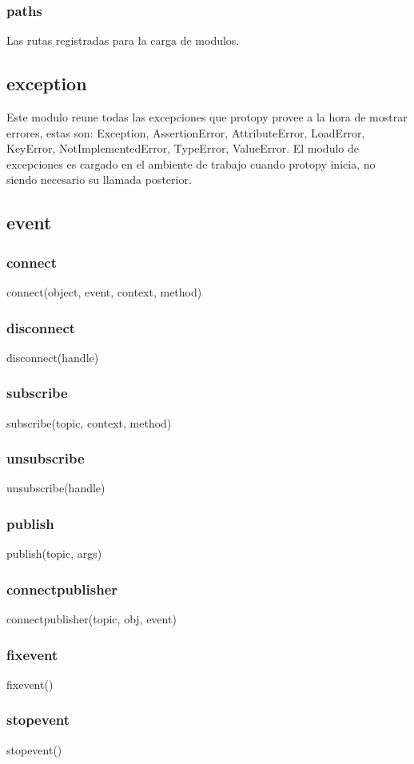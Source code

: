 \subsubsection*{paths}
Las rutas registradas para la carga de modulos.

\subsection{exception}
Este modulo reune todas las excepciones que protopy provee a la hora de mostrar
errores, estas son:
Exception, AssertionError, AttributeError, LoadError, KeyError,
NotImplementedError, TypeError, ValueError.
El modulo de excepciones es cargado en el ambiente de trabajo cuando protopy
inicia, no siendo necesario su llamada posterior.

\subsection{event}
\subsubsection*{connect}
connect(object, event, context, method)
\subsubsection*{disconnect}
disconnect(handle)
\subsubsection*{subscribe}
subscribe(topic, context, method)
\subsubsection*{unsubscribe}
unsubscribe(handle)
\subsubsection*{publish}
publish(topic, args)
\subsubsection*{connectpublisher}
connectpublisher(topic, obj, event)
\subsubsection*{fixevent}
fixevent()
\subsubsection*{stopevent}
stopevent()
